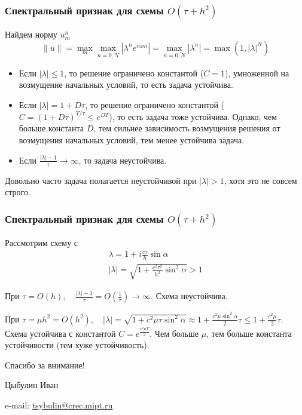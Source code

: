\documentclass[professionalfonts,compress,unicode,aspectratio=169]{beamer}
\newcommand{\colorhref}[2]{\href{#1}{\textcolor{miptbase!30!black}{#2}}}
\begin{document}
\begin{frame}\frametitle{Спектральный признак для схемы $O(\tau+h^2)$} 
	Найдем норму $u_m^n$
	\[
	\|u\| = \max_m \max_{n=\overline{0,N}} |\lambda^n e^{i \alpha m}| = \max_{n=\overline{0,N}} |\lambda^n| = \max(1, |\lambda|^{N})
	\]
	\begin{itemize}
		\item Если $|\lambda| \leqslant 1$, то решение ограничено константой ($C = 1$), умноженной на возмущение начальных условий, то есть задача устойчива.
		\item Если $|\lambda| = 1 + D\tau$, то решение ограничено константой ($C = (1 + D\tau)^{T/\tau} \leqslant e^{DT}$), то есть задача тоже устойчива. 
	Однако, чем больше константа $D$, тем сильнее зависимость возмущения решения от возмущения начальных условий, тем менее устойчива задача.
		\item Если $\frac{|\lambda|-1}{\tau} \rightarrow \infty$, то задача неустойчива.
	\end{itemize}
	Довольно часто задача полагается неустойчивой при $|\lambda| > 1$, хотя это не совсем строго.
\end{frame}

\begin{frame}\frametitle{Спектральный признак для схемы $O(\tau+h^2)$}
	Рассмотрим схему с
	\begin{gather*}
	\lambda = 1 + i \frac{c\tau}{h} \sin \alpha\\
	|\lambda| = \sqrt{1 + \frac{c^2\tau^2}{h^2}\sin^2 \alpha} > 1
	\end{gather*}

	При $\tau = O(h),\quad \frac{|\lambda| - 1}{\tau} = O\left(\frac{1}{\tau}\right) \rightarrow \infty$. Схема неустойчива.

	При $\tau = \mu h^2 = O(h^2), \quad |\lambda| = \sqrt{1 +
c^2\mu\tau\sin^2\alpha} \approx 1 + \frac{c^2\mu\sin^2\alpha}{2}\tau \leqslant 1
+ \frac{c^2\mu}{2}\tau$.
	Схема устойчива с константой $C = e^{\frac{c^2\mu T}{2}}$. Чем больше $\mu$,
тем больше константа устойчивости (тем хуже устойчивость).
\end{frame}


\begin{frame}[plain]
  \begin{center}
  {\Huge Спасибо за внимание!}
  \vspace{8ex}

  Цыбулин Иван

  e-mail: \colorhref{mailto:tsybulin@crec.mipt.ru}{tsybulin@crec.mipt.ru}
  \end{center}
\end{frame}
\end{document}
